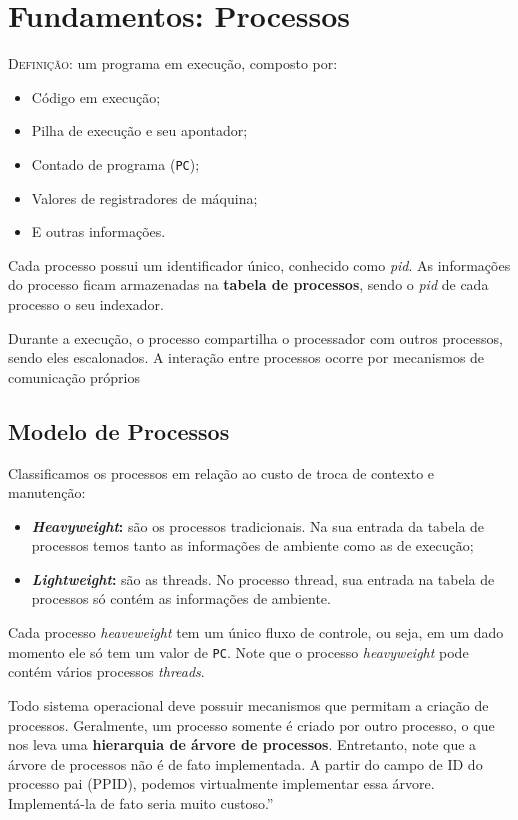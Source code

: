 \chapter{Fundamentos: Processos}

\textsc{Definição:} um programa em execução, composto por:
\begin{itemize}
  \item Código em execução;
  \item Pilha de execução e seu apontador;
  \item Contado de programa (\texttt{PC});
  \item Valores de registradores de máquina;
  \item E outras informações.
\end{itemize}

Cada processo possui um identificador único, conhecido como \textit{pid}. As informações do processo ficam armazenadas na \textbf{tabela de processos}, sendo o \textit{pid} de cada processo o seu indexador.

Durante a execução, o processo compartilha o processador com outros processos, sendo eles escalonados. A interação entre processos ocorre por mecanismos de comunicação próprios





\section{Modelo de Processos}
Classificamos os processos em relação ao custo de troca de contexto e manutenção:

\begin{itemize}
  \item \textbf{\textit{Heavyweight}:} são os processos tradicionais. Na sua entrada da tabela de processos temos tanto as informações de ambiente como as de execução;
  \item \textbf{\textit{Lightweight}:} são as threads. No processo thread, sua entrada na tabela de processos só contém as informações de ambiente.
\end{itemize}

Cada processo \textit{heaveweight} tem um único fluxo de controle, ou seja, em um dado momento ele só tem um valor de \texttt{PC}. Note que o processo \textit{heavyweight} pode contém vários processos \textit{threads}.

Todo sistema operacional deve possuir mecanismos que permitam a criação de processos. Geralmente, um processo somente é criado por outro processo, o que nos leva uma \textbf{hierarquia de árvore de processos}. Entretanto, note que a árvore de processos não é de fato implementada. A partir do campo de ID do processo pai (PPID), podemos virtualmente implementar essa árvore. Implementá-la de fato seria muito custoso.''







